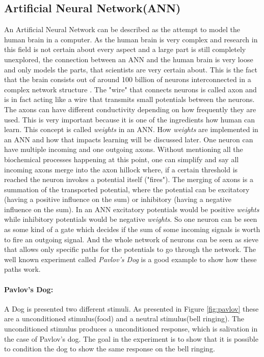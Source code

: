 \subsection{Artificial Neural Network(ANN)}
An Artificial Neural Network can be described as the attempt to model the human brain in a computer. As the human brain is very complex and research in this field is not certain about every aspect and a large part is still completely unexplored, the connection between an ANN and the human brain is very loose and only models the parts, that scientists are very certain about. 
This is the fact that the brain consists out of around 100 billion of neurons interconnected in a complex network structure \cite{Herculano09}.
The "wire" that connects neurons is called axon and is in fact acting like a wire that transmits  small potentials  between the neurons.
The axons can have different conductivity depending on how frequently they are used.
This is very important because it is one of the ingredients how human can learn. 
This concept is called \emph{weights} in an ANN. How \emph{weights} are implemented in an ANN and how that impacts learning will be discussed later.
One neuron can have multiple incoming and one outgoing axons. 
Without mentioning all the biochemical processes happening at this point, one can simplify and say all incoming axons merge into the axon hillock where, if a certain threshold is reached the neuron invokes a potential itself ("fires").
The merging of axons is a summation of the transported potential, where the potential can be excitatory (having a positive influence on the sum) or inhibitory (having a negative influence on the sum). In an ANN excitatory potentials would be positive \emph{weights} while inhibitory potentials would be negative \emph{weights}.
\cite{BGDFKI}
So one neuron can be seen as some kind of a gate which decides if the sum of some incoming signals is worth to fire an outgoing signal.
And the whole network of neurons can be seen as sieve that allows only specific paths for the potentials to go through the network. 
The well known experiment called \emph{Pavlov's Dog} is a good example to show how these paths work.

\paragraph{Pavlov's Dog:}
A Dog is presented two different stimuli. As presented in Figure \ref{fig:pavlov} these are a unconditioned stimulus(food) and a neutral stimulus(bell ringing). The unconditioned stimulus produces a unconditioned response, which is salivation in the case of Pavlov's dog. The goal in the experiment is to show that it is possible to condition the dog to show the same response on the bell ringing.


